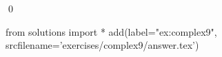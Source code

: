 
\begin{ex} 
  \label{ex:complex9}
  
  \qed
\end{ex} 
\begin{python0}
from solutions import *
add(label="ex:complex9",
    srcfilename='exercises/complex9/answer.tex') 
\end{python0}
